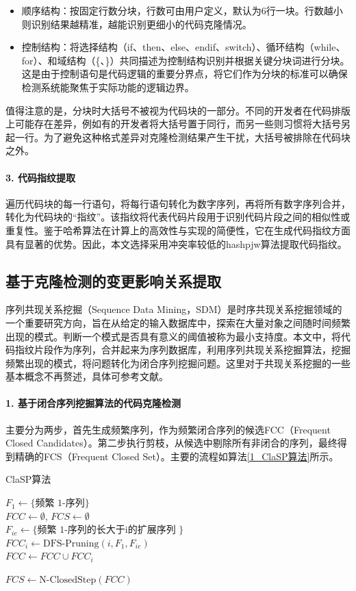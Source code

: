 \begin{itemize}
    \item 顺序结构：按固定行数分块，行数可由用户定义，默认为6行一块。行数越小则识别结果越精准，越能识别更细小的代码克隆情况。
    
    \item 控制结构：将选择结构（if、then、else、endif、switch）、循环结构（while、for）、和域结构（\{、\}）共同描述为控制结构识别并根据关键分块词进行分块。这是由于控制语句是代码逻辑的重要分界点，将它们作为分块的标准可以确保检测系统能聚焦于实际功能的逻辑边界。
\end{itemize}

值得注意的是，分块时大括号不被视为代码块的一部分。不同的开发者在代码排版上可能存在差异，例如有的开发者将大括号置于同行，而另一些则习惯将大括号另起一行。为了避免这种格式差异对克隆检测结果产生干扰，大括号被排除在代码块之外。

\paragraph{3. 代码指纹提取} 遍历代码块的每一行语句，将每行语句转化为数字序列，再将所有数字序列合并，转化为代码块的“指纹”。该指纹将代表代码片段用于识别代码片段之间的相似性或重复性。鉴于哈希算法在计算上的高效性与实现的简便性，它在生成代码指纹方面具有显著的优势。因此，本文选择采用冲突率较低的hashpjw算法提取代码指纹。

\subsection{基于克隆检测的变更影响关系提取}
序列共现关系挖掘（Sequence Data Mining，SDM）是时序共现关系挖掘领域的一个重要研究方向，旨在从给定的输入数据库中，探索在大量对象之间随时间频繁出现的模式。判断一个模式是否具有意义的阈值被称为最小支持度。本文中，将代码指纹片段作为序列，合并起来为序列数据库，利用序列共现关系挖掘算法，挖掘频繁出现的模式，将问题转化为闭合序列挖掘问题。这里对于共现关系挖掘的一些基本概念不再赘述，具体可参考文献\cite{2013ClaSP}。

\paragraph{1. 基于闭合序列挖掘算法的代码克隆检测}主要分为两步，首先生成频繁序列，作为频繁闭合序列的候选FCC（Frequent Closed Candidates）。第二步执行剪枝，从候选中剔除所有非闭合的序列，最终得到精确的FCS（Frequent Closed Set）。主要的流程如算法\ref{1_ClaSP算法}所示。

\begin{algorithm}
\caption{ClaSP算法}
\label{1_ClaSP算法}
 $F_1 \gets \{\text{频繁 1-序列}\}$ \\
 $FCC \gets \emptyset$, $FCS \gets \emptyset$  \\
{
    $F_{ie} \gets \{\text{频繁 1-序列的长大于i的扩展序列 } \}$ \\
    $FCC_i \gets \text{DFS-Pruning}(i, F_1, F_{ie})$ \\
    $FCC \gets FCC \cup FCC_i$
}

 $FCS \gets \text{N-ClosedStep}(FCC)$
\end{algorithm}


